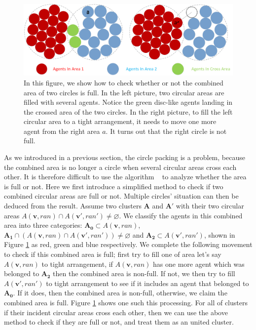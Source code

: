 \documentclass[letterpaper]{article}
\theoremstyle{definition}
\theoremstyle{plain}
\theoremstyle{definition}
\theoremstyle{remark}
\begin{document}
\begin{figure}[!ht]
\centering
\includegraphics[width=1\linewidth]{figs/ConnectClusters.png}
\caption{
In this figure, we show how to check whether or not the combined area of two circles is full. In the left picture, two circular areas are filled with several agents. Notice the green disc-like agents landing in the crossed area of the two circles. In the right picture, to fill the left circular area to a tight arrangement, it needs to move one more agent from the right area $a$. It turns out that the right circle is not full. 
}
\label{fig:combinedcircles}
\end{figure}
As we introduced in a previous section, the circle packing is a problem, because the combined area is no longer a circle when several circular areas cross each other. It is therefore difficult to use the algorithm ~\cite{graham1998dense} to analyze whether the area is full or not. Here we first introduce a simplified method to check if two combined circular areas are full or not. Multiple circles' situation can then be deduced from the result.
Assume two clusters $\mathbf{A}$ and $\mathbf{A'}$ with their two circular areas $A(\mathbf v,ran) \cap A(\mathbf v',ran') \neq \varnothing$. We classify the agents in this combined area into three categories: $\mathbf{A_0} \subset A(\mathbf v,ran)$, $\mathbf{A_1} \cap (A(\mathbf v,ran) \cap A(\mathbf v',ran') ) \neq \varnothing$ and $\mathbf{A_2} \subset A(\mathbf v',ran')$, shown in Figure
\ref{fig:combinedcircles} as red, green and blue respectively. We complete the following movement to check if this combined area is full; first try to fill one of area let's say $A(\mathbf v,ran)$ to tight arrangement, if $A(\mathbf v,ran)$ has one more agent which was belonged to $\mathbf{A_2}$ then the combined area is non-full. If not, we then try to fill  $A(\mathbf v',ran')$ to tight arrangement to see if it includes an agent that belonged to $\mathbf{A_0}$. If it does, then the combined area is non-full, otherwise, we claim the combined area is full. Figure \ref{fig:combinedcircles} shows one such this processing.
For all of clusters if their incident circular areas cross each other, then we can use the above method to check if they are full or not, and treat them as an united cluster. 
\end{document}
